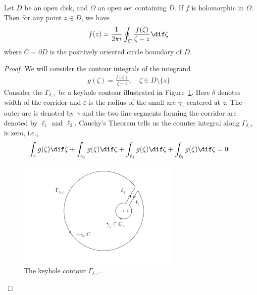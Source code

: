 \documentclass[thmcnt=section, color=cyan, 12pt]{my-elegantbook}
\begin{document}
\begin{theorem} \label{thm:5}
    Let $D$ be an open disk,
    and $\Omega$ an open set containing $\overline{D}$.
    If $f$ is holomorphic in $\Omega$.
    Then for any point $z \in D$, we have
    \begin{align*}
        f(z) = \frac{1}{2 \pi i} \oint_{C} \frac{f(\zeta)}{\zeta - z} \dif \zeta
    \end{align*}
    where $C = \partial D$ is the positively oriented circle boundary of $D$.
\end{theorem}

\begin{proof}
    We will consider the contour integrals of the integrand
    \begin{align*}
        g(\zeta) = \frac{f(\zeta)}{\zeta - z}, \quad \zeta \in D \setminus \{z\}
    \end{align*}
    Consider the $\Gamma_{\delta, \varepsilon}$ be a keyhole contour illustrated
    in Figure~\ref{fig:2}.
    Here $\delta$ denotes width of the corridor and $\varepsilon$
    is the radius of the small arc $\gamma_{\varepsilon}$ centered at $z$.
    The outer arc is denoted by $\gamma$ and the two line segments forming the corridor
    are denoted by $\ell_1$ and $\ell_2$.
    Cauchy's Theorem tells us the counter integral
    along $\Gamma_{\delta, \varepsilon}$ is zero, i.e.,
    \begin{align}
        \int_\gamma g(\zeta) \dif \zeta
        + \int_{\gamma_{\varepsilon}} g(\zeta) \dif \zeta
        + \int_{\ell_1} g(\zeta) \dif \zeta
        + \int_{\ell_2} g(\zeta) \dif \zeta
        = 0
        \label{eq:9}
    \end{align}

    \begin{figure}[H]
        \centering
        \includegraphics[width=0.7\textwidth]{figures/keyhole-for-proving-the-cauchy-integral-formula.png}
        \caption{The keyhole contour $\Gamma_{\delta, \varepsilon}$.}
        \label{fig:2}
    \end{figure}


\end{proof}
\end{document}
